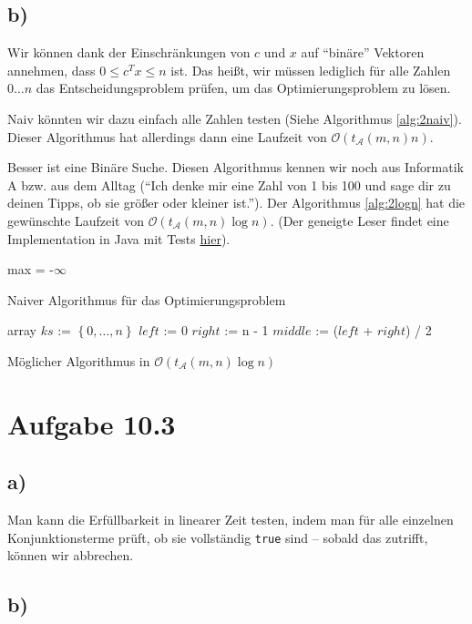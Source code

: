 \documentclass{article}
\begin{document}
\subsection*{b)}
Wir können dank der Einschränkungen von $c$ und $x$ auf "`binäre"' Vektoren annehmen, dass $0 \leq c^Tx \leq n$ ist.
Das heißt, wir müssen lediglich für alle Zahlen $0\dots n$ das Entscheidungsproblem prüfen, um das Optimierungsproblem zu lösen. 

Naiv könnten wir dazu einfach alle Zahlen testen (Siehe Algorithmus \ref{alg:2naiv}). Dieser Algorithmus hat allerdings dann eine Laufzeit von $\mathcal{O}\left(t_\mathcal{A}\left(m,n\right)n\right)$.

Besser ist eine Binäre Suche. Diesen Algorithmus kennen wir noch aus Informatik A bzw. aus dem Alltag ("`Ich denke mir eine Zahl von 1 bis 100 und sage dir zu deinen Tipps, ob sie größer oder kleiner ist."'). Der Algorithmus \ref{alg:2logn} hat die gewünschte Laufzeit von $\mathcal{O}\left(t_\mathcal{A}\left(m,n\right)\log{n}\right)$. (Der geneigte Leser findet eine Implementation in Java mit Tests \href{http://uni.sebastian-hoeffner.de/DInf/DInf14102b.java}{hier}).

\begin{algorithm}[!ht]
\DontPrintSemicolon
max = -$\infty$\;
\;
\label{alg:2naiv}
\caption{Naiver Algorithmus für das Optimierungsproblem}
\end{algorithm}


\begin{algorithm}[!ht]
  \DontPrintSemicolon
  array $ks$ := $\left\{0, \dots, n\right\}$\;
  $left$     := 0\;
  $right$    := n - 1\;
  $middle$   := ($left$ + $right$) / 2\;
  \label{alg:2logn}
  \caption{Möglicher Algorithmus in $\mathcal{O}\left(t_\mathcal{A}\left(m,n\right)\log{n}\right)$}
\end{algorithm}

\section*{Aufgabe 10.3}
\subsection*{a)}
Man kann die Erfüllbarkeit in linearer Zeit testen, indem man für alle einzelnen Konjunktionsterme prüft, ob sie vollständig \texttt{true} sind -- sobald das zutrifft, können wir abbrechen.


\subsection*{b)}
\end{document}
